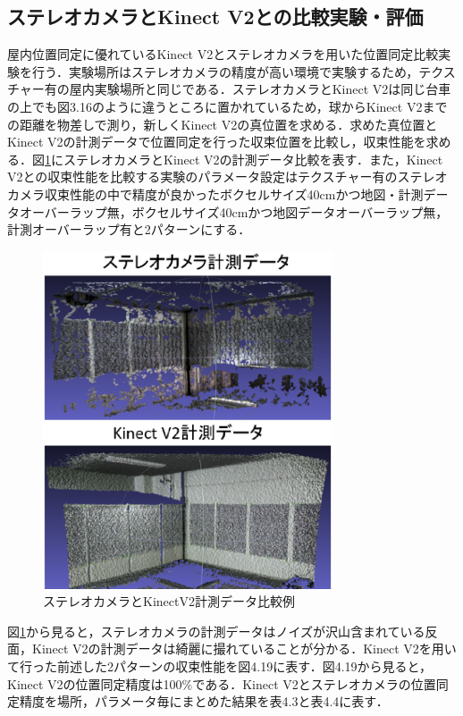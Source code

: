 \subsection{ステレオカメラとKinect V2との比較実験・評価}
屋内位置同定に優れているKinect V2とステレオカメラを用いた位置同定比較実験を行う．実験場所はステレオカメラの精度が高い環境で実験するため，テクスチャー有の屋内実験場所と同じである．ステレオカメラとKinect V2は同じ台車の上でも図3.16のように違うところに置かれているため，球からKinect V2までの距離を物差しで測り，新しくKinect V2の真位置を求める．求めた真位置とKinect V2の計測データで位置同定を行った収束位置を比較し，収束性能を求める．図{\ref{ステレオカメラとKinectV2計測データ比較}}にステレオカメラとKinect V2の計測データ比較を表す．また，Kinect V2との収束性能を比較する実験のパラメータ設定はテクスチャー有のステレオカメラ収束性能の中で精度が良かったボクセルサイズ40cmかつ地図・計測データオーバーラップ無，ボクセルサイズ40cmかつ地図データオーバーラップ無，計測オーバーラップ有と2パターンにする．

%
\begin{figure}[htbp]
  \begin{center}
   \includegraphics[height=100mm]{figure/ステレオカメラとKinectV2計測データ比較.eps}
   \caption{ステレオカメラとKinectV2計測データ比較例}
   \label{ステレオカメラとKinectV2計測データ比較}
  \end{center}
\end{figure}
%

\newpage

図{\ref{ステレオカメラとKinectV2計測データ比較}}から見ると，ステレオカメラの計測データはノイズが沢山含まれている反面，Kinect V2の計測データは綺麗に撮れていることが分かる．Kinect V2を用いて行った前述した2パターンの収束性能を図4.19に表す．図4.19から見ると，Kinect V2の位置同定精度は100\%である．Kinect V2とステレオカメラの位置同定精度を場所，パラメータ毎にまとめた結果を表4.3と表4.4に表す．

